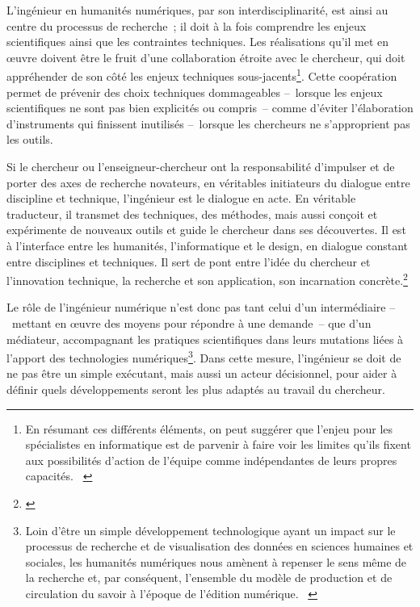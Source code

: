 \documentclass[a4paper,12pt,twoside]{book}
\let\quoteOld\quote
\let\endquoteOld\endquote
\renewenvironment{quote}{\small\quoteOld}{\endquoteOld}
\newcommand{\g}[1]{\og#1~\fg}
\begin{document}
L'ingénieur en humanités numériques, par son interdisciplinarité, est ainsi au centre du processus de recherche~; il doit à la fois comprendre les enjeux scientifiques ainsi que les contraintes techniques. Les réalisations qu'il met en œuvre doivent être le fruit d'une collaboration étroite avec le chercheur, qui doit appréhender de son côté les enjeux techniques sous-jacents\footnote{\g{En résumant ces différents éléments, on peut suggérer que l’enjeu pour les spécialistes en informatique est de parvenir à faire voir les limites qu’ils fixent aux possibilités d’action de l’équipe comme indépendantes de leurs propres capacités.} \cite[§~21]{oberhauserCollaborationsEquivoques2016}}. Cette coopération permet de prévenir des choix techniques dommageables –~lorsque les enjeux scientifiques ne sont pas bien explicités ou compris~– comme d'éviter l'élaboration d'instruments qui finissent inutilisés –~lorsque les chercheurs ne s'approprient pas les outils.

\begin{quote}
	Si le chercheur ou l’enseigneur-chercheur ont la responsabilité d’impulser et de porter des axes de recherche novateurs, en véritables initiateurs du dialogue entre discipline et technique, l’ingénieur est le dialogue en acte. En véritable traducteur, il transmet des techniques, des méthodes, mais aussi conçoit et expérimente de nouveaux outils et guide le chercheur dans ses découvertes. Il est à l’interface entre les humanités, l’informatique et le design, en dialogue constant entre disciplines et techniques. Il sert de pont entre l’idée du chercheur et l’innovation technique, la recherche et son application, son incarnation concrète.\footnote{\cite[p.~3]{massotDessinerActeursHumanites2018}}
\end{quote}

Le rôle de l'ingénieur numérique n'est donc pas tant celui d'un intermédiaire –~mettant en œuvre des moyens pour répondre à une demande~– que d'un médiateur, accompagnant les pratiques scientifiques dans leurs mutations liées à l'apport des technologies numériques\footnote{\g{Loin d’être un simple développement technologique ayant un impact sur le processus de recherche et de visualisation des données en sciences humaines et sociales, les humanités numériques nous amènent à repenser le sens même de la recherche et, par conséquent, l’ensemble du modèle de production et de circulation du savoir à l’époque de l’édition numérique.} \cite[§~3]{sinatraChapitreHistoireHumanites2014}}. Dans cette mesure, l'ingénieur se doit de ne pas être un simple exécutant, mais aussi un acteur décisionnel, pour aider à définir quels développements seront les plus adaptés au travail du chercheur.
\end{document}
